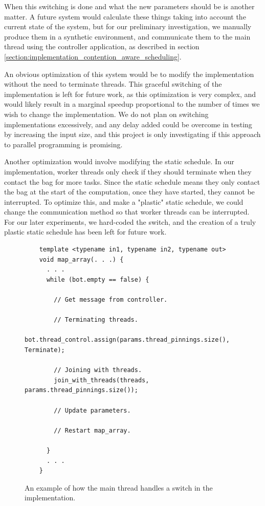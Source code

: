 When this switching is done and what the new parameters should be is another matter. A future system would calculate these things taking into account the current state of the system, but for our preliminary investigation, we manually produce them in a synthetic environment, and communicate them to the main thread using the controller application, as described in section \ref{section:implementation_contention_aware_scheduling}.

An obvious optimization of this system would be to modify the implementation without the need to terminate threads. This graceful switching of the implementation is left for future work, as this optimization is very complex, and would likely result in a marginal speedup proportional to the number of times we wish to change the implementation. We do not plan on switching implementations excessively, and any delay added could be overcome in testing by increasing the input size, and this project is only investigating if this approach to parallel programming is promising.

Another optimization would involve modifying the static schedule. In our implementation, worker threads only check if they should terminate when they contact the bag for more tasks. Since the static schedule means they only contact the bag at the start of the computation, once they have started, they cannot be interrupted. To optimize this, and make a "plastic" static schedule, we could change the communication method so that worker threads can be interrupted. For our later experiments, we hard-coded the switch, and the creation of a truly plastic static schedule has been left for future work.



\begin{figure}
	\begin{lstlisting}
	template <typename in1, typename in2, typename out>
	void map_array(. . .) {
	  . . .
	  while (bot.empty == false) {
  
	    // Get message from controller.
  
        // Terminating threads.
        bot.thread_control.assign(params.thread_pinnings.size(), Terminate);
  
        // Joining with threads.
        join_with_threads(threads, params.thread_pinnings.size());
  
        // Update parameters.
  
        // Restart map_array.
  	    
	  }
	  . . .
	}
	\end{lstlisting}

	\caption{An example of how the main thread handles a switch in the implementation.}
	\label{fig:implementation_main_thread_bot_comms}
\end{figure}



